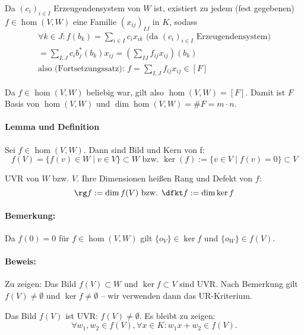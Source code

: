 	Da $(c_i)_{i\in I}$ Erzeugendensystem von $W$ ist, existiert zu jedem (fest gegebenen) $f\in\hom (V,W)$ eine Familie $(x_{ij})_{IJ}$ in $K$, sodass
		\begin{gather*}
		\forall k\in J: f(b_k) = \sum_{i\in I} c_i x_{ik} \text{ (da $(c_i)_{i\in I}$ Erzeugendensystem)}\\
		= \sum_{I,J}c_ib_j^*(b_k)x_{ij} = \left(\sum_{IJ} f_{ij}x_{ij}\right)(b_k)\\
		\text{also (Fortsetzungssatz): } f=\sum_{I,J}f_{ij}x_{ij} \in [F]
		\end{gather*}
	
	Da $f\in\hom (V,W)$ beliebig war, gilt also $\hom (V,W) = [F]$. Damit ist $F$ Basis von $\hom (V,W)$ und $\dim\hom (V,W) = \# F = m\cdot n$.
	
\paragraph{Lemma und Definition}
	Sei $f\in \hom (V,W)$. Dann sind Bild und Kern von f:
		\begin{equation*}
			f(V) = \{f(v)\in W\mid v\in V \}\subset W \text{ bzw. } \ker (f) := \{v\in V\mid f(v) = 0 \} \subset V
		\end{equation*}
	
	UVR von $W$ bzw. $V$. Ihre Dimensionen heißen Rang und Defekt von $f$:
		\begin{equation*}
			\rg f := \dim f(V) \text{ bzw. } \dfkt f := \dim \ker f
		\end{equation*}

\paragraph{Bemerkung: }
	Da $f(0)=0$ für  $f\in \hom (V,W)$ gilt $\{o_V \}\in \ker f$ und $\{o_W \}\in f(V)$.

\paragraph{Beweis: }
	Zu zeigen: Das Bild $f(V)\subset W$ und $\ker f\subset V$ sind UVR. Nach Bemerkung gilt $f(V)\neq \emptyset$ und $\ker f \neq \emptyset$ -- wir verwenden dann das UR-Kriterium.
	
	Das Bild $f(V)$ ist UVR: $f(V) \neq \emptyset$. Es bleibt zu zeigen:
		\begin{equation*}
			\forall w_1,w_2\in f(V), \forall x\in K: w_1x+w_2 \in f(V).
		\end{equation*}
	
